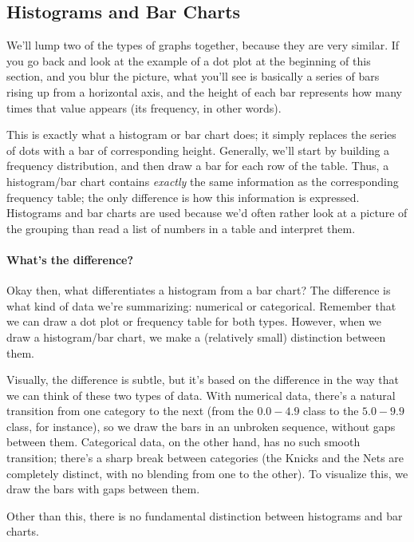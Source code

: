 \subsection{Histograms and Bar Charts}
We'll lump two of the types of graphs together, because they are very similar.  If you go back and look at the example of a dot plot at the beginning of this section, and you blur the picture, what you'll see is basically a series of bars rising up from a horizontal axis, and the height of each bar represents how many times that value appears (its frequency, in other words).

This is exactly what a histogram or bar chart does; it simply replaces the series of dots with a bar of corresponding height.  Generally, we'll start by building a frequency distribution, and then draw a bar for each row of the table.  Thus, a histogram/bar chart contains \emph{exactly} the same information as the corresponding frequency table; the only difference is how this information is expressed.  Histograms and bar charts are used because we'd often rather look at a picture of the grouping than read a list of numbers in a table and interpret them.

\paragraph{What's the difference?} Okay then, what differentiates a histogram from a bar chart?  The difference is what kind of data we're summarizing: numerical or categorical.  Remember that we can draw a dot plot or frequency table for both types.  However, when we draw a histogram/bar chart, we make a (relatively small) distinction between them.

Visually, the difference is subtle, but it's based on the difference in the way that we can think of these two types of data.  With numerical data, there's a natural transition from one category to the next (from the $0.0 - 4.9$ class to the $5.0 - 9.9$ class, for instance), so we draw the bars in an unbroken sequence, without gaps between them.  Categorical data, on the other hand, has no such smooth transition; there's a sharp break between categories (the Knicks and the Nets are completely distinct, with no blending from one to the other).  To visualize this, we draw the bars with gaps between them.

Other than this, there is no fundamental distinction between histograms and bar charts.\\

